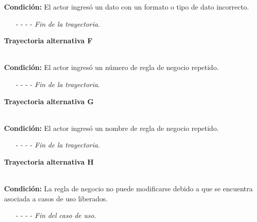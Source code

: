 \noindent \textbf{Condición:} El actor ingresó un dato con un formato o tipo de dato incorrecto.
\begin{enumerate}
	\UCpaso[\UCsist] Muestra el mensaje  señalando el campo que presenta el error en la pantalla .
	\UCpaso Regresa al paso \ref{CU8.2-P5} de la trayectoria principal.
	\item[- -] - - {\em {Fin de la trayectoria}}.
\end{enumerate}
\hypertarget{CU8-2:TAF}{\textbf{Trayectoria alternativa F}}\\
\noindent \textbf{Condición:} El actor ingresó un número de regla de negocio repetido.
\begin{enumerate}
	\UCpaso[\UCsist] Muestra el mensaje  señalando el campo que presenta la duplicidad en la pantalla .
	\UCpaso Regresa al paso \ref{CU8.2-P5} de la trayectoria principal.
	\item[- -] - - {\em {Fin de la trayectoria}}.
\end{enumerate}

\hypertarget{CU8-2:TAG}{\textbf{Trayectoria alternativa G}}\\
\noindent \textbf{Condición:} El actor ingresó un nombre de regla de negocio repetido.
\begin{enumerate}
	\UCpaso[\UCsist] Muestra el mensaje  señalando el campo que presenta la duplicidad en la pantalla .
	\UCpaso Regresa al paso \ref{CU8.2-P5} de la trayectoria principal.
	\item[- -] - - {\em {Fin de la trayectoria}}.
\end{enumerate}
\hypertarget{CU8-2:TAH}{\textbf{Trayectoria alternativa H}}\\
\noindent \textbf{Condición:} La regla de negocio no puede modificarse debido a que se encuentra asociada a casos de uso liberados.
\begin{enumerate}
	\UCpaso[\UCsist] Oculta el botón \editar de la regla de negocio que esta asociada a casos de uso liberados de la pantalla .
	\item[- -] - - {\em {Fin del caso de uso}}.
\end{enumerate}
